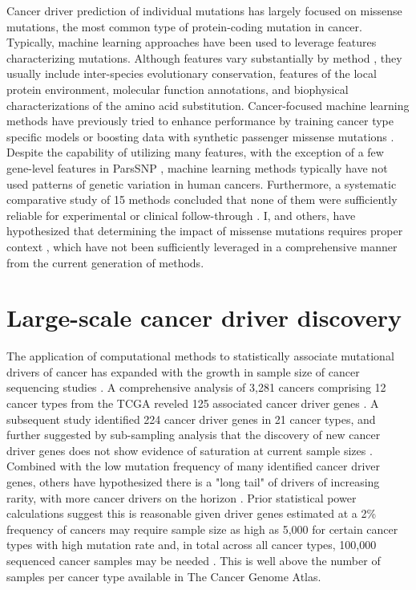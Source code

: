 Cancer driver prediction of individual mutations has largely focused on missense mutations, the most common type of protein-coding mutation in cancer. Typically, machine learning approaches have been used to leverage features characterizing mutations. Although features vary substantially by method \cite{RN32, RN33, RN35, RN36, RN39, RN29, RN37}, they usually include inter-species evolutionary conservation, features of the local protein environment, molecular function annotations, and biophysical characterizations of the amino acid substitution. Cancer-focused machine learning methods have previously tried to enhance performance by training cancer type specific models \cite{RN10, RN12} or boosting data with synthetic passenger missense mutations \cite{RN10}. Despite the capability of utilizing many features, with the exception of a few gene-level features in ParsSNP \cite{RN9}, machine learning methods typically have not used patterns of genetic variation in human cancers. Furthermore, a systematic comparative study of 15 methods concluded that none of them were sufficiently reliable for experimental or clinical follow-through \cite{RN46}. I, and others, have hypothesized that determining the impact of missense mutations requires proper context \cite{RN47, RN57}, which have not been sufficiently leveraged in a comprehensive manner from the current generation of methods.

\section{Large-scale cancer driver discovery}
\label{sec:section}

The application of computational methods to statistically associate mutational drivers of cancer has expanded with the growth in sample size of cancer sequencing studies \cite{RN99, RN105, RN14, RN87, RN158, RN12, RN13, RN54, RN96, RN98, RN154, RN43}. A comprehensive analysis of 3,281 cancers comprising 12 cancer types from the TCGA reveled 125 associated cancer driver genes \cite{RN12}.  A subsequent study identified 224 cancer driver genes in 21 cancer types, and further suggested by sub-sampling analysis that the discovery of new cancer driver genes does not show evidence of saturation at current sample sizes \cite{RN14}. Combined with the low mutation frequency of many identified cancer driver genes, others have hypothesized there is a "long tail" of drivers of increasing rarity, with more cancer drivers on the horizon \cite{RN148, RN147}. Prior statistical power calculations suggest this is reasonable given driver genes estimated at a 2\% frequency of cancers may require sample size as high as 5,000 for certain cancer types with high mutation rate and, in total across all cancer types, 100,000 sequenced cancer samples may be needed \cite{RN14}. This is well above the number of samples per cancer type available in The Cancer Genome Atlas. 


